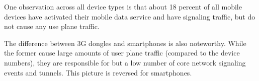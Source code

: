 One observation across all device types is that about 18 percent of all mobile devices have activated their mobile data service and have signaling traffic, but do not cause any use plane traffic.

The difference between 3G dongles and smartphones is also noteworthy. While the former cause large amounts of user plane traffic (compared to the device numbers), they are responsible for but a low number of core network signaling events and tunnels. This picture is reversed for smartphones.


